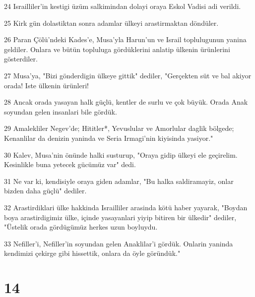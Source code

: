 \par 24 Israilliler'in kestigi üzüm salkimindan dolayi oraya Eskol Vadisi adi verildi.
\par 25 Kirk gün dolastiktan sonra adamlar ülkeyi arastirmaktan döndüler.
\par 26 Paran Çölü'ndeki Kades'e, Musa'yla Harun'un ve Israil toplulugunun yanina geldiler. Onlara ve bütün topluluga gördüklerini anlatip ülkenin ürünlerini gösterdiler.
\par 27 Musa'ya, "Bizi gönderdigin ülkeye gittik" dediler, "Gerçekten süt ve bal akiyor orada! Iste ülkenin ürünleri!
\par 28 Ancak orada yasayan halk güçlü, kentler de surlu ve çok büyük. Orada Anak soyundan gelen insanlari bile gördük.
\par 29 Amalekliler Negev'de; Hititler*, Yevuslular ve Amorlular daglik bölgede; Kenanlilar da denizin yaninda ve Seria Irmagi'nin kiyisinda yasiyor."
\par 30 Kalev, Musa'nin önünde halki susturup, "Oraya gidip ülkeyi ele geçirelim. Kesinlikle buna yetecek gücümüz var" dedi.
\par 31 Ne var ki, kendisiyle oraya giden adamlar, "Bu halka saldiramayiz, onlar bizden daha güçlü" dediler.
\par 32 Arastirdiklari ülke hakkinda Israilliler arasinda kötü haber yayarak, "Boydan boya arastirdigimiz ülke, içinde yasayanlari yiyip bitiren bir ülkedir" dediler, "Üstelik orada gördügümüz herkes uzun boyluydu.
\par 33 Nefiller'i, Nefiller'in soyundan gelen Anaklilar'i gördük. Onlarin yaninda kendimizi çekirge gibi hissettik, onlara da öyle göründük."

\chapter{14}

